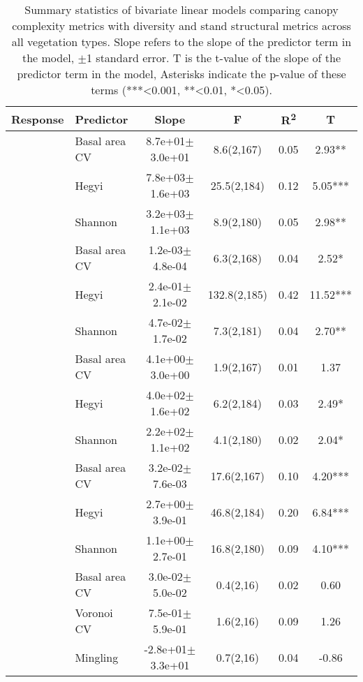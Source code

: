 \begin{table}[]
\centering
\caption{Summary statistics of bivariate linear models comparing canopy complexity metrics with diversity and stand structural metrics across all vegetation types. Slope refers to the slope of the predictor term in the model, $\pm$1 standard error. T is the t-value of the slope of the predictor term in the model, Asterisks indicate the p-value of these terms (***<0.001, **<0.01, *<0.05).} 
\label{bivar_lm_summ_all}
\begin{tabular}{llcccS[table-format=-2.2, table-space-text-post = {***}]}
  \toprule
{Response} & {Predictor} & {Slope} & {F} & {R\textsuperscript{2}} & {T} \\ 
  \midrule
{} & Basal area CV &  8.7e+01$\pm$3.0e+01 & 8.6(2,167) & 0.05 & 2.93** \\ 
   & Hegyi &  7.8e+03$\pm$1.6e+03 & 25.5(2,184) & 0.12 & 5.05*** \\ 
   & Shannon &  3.2e+03$\pm$1.1e+03 & 8.9(2,180) & 0.05 & 2.98** \\ 
   \midrule
{} & Basal area CV &  1.2e-03$\pm$4.8e-04 & 6.3(2,168) & 0.04 & 2.52* \\ 
   & Hegyi &  2.4e-01$\pm$2.1e-02 & 132.8(2,185) & 0.42 & 11.52*** \\ 
   & Shannon &  4.7e-02$\pm$1.7e-02 & 7.3(2,181) & 0.04 & 2.70** \\ 
   \midrule
{} & Basal area CV &  4.1e+00$\pm$3.0e+00 & 1.9(2,167) & 0.01 & 1.37 \\ 
   & Hegyi &  4.0e+02$\pm$1.6e+02 & 6.2(2,184) & 0.03 & 2.49* \\ 
   & Shannon &  2.2e+02$\pm$1.1e+02 & 4.1(2,180) & 0.02 & 2.04* \\ 
   \midrule
{} & Basal area CV &  3.2e-02$\pm$7.6e-03 & 17.6(2,167) & 0.10 & 4.20*** \\ 
   & Hegyi &  2.7e+00$\pm$3.9e-01 & 46.8(2,184) & 0.20 & 6.84*** \\ 
   & Shannon &  1.1e+00$\pm$2.7e-01 & 16.8(2,180) & 0.09 & 4.10*** \\ 
   \midrule
{} & Basal area CV &  3.0e-02$\pm$5.0e-02 & 0.4(2,16) & 0.02 & 0.60 \\ 
   & Voronoi CV &  7.5e-01$\pm$5.9e-01 & 1.6(2,16) & 0.09 & 1.26 \\ 
   & Mingling & -2.8e+01$\pm$3.3e+01 & 0.7(2,16) & 0.04 & -0.86 \\ 

\end{tabular}
\end{table}
